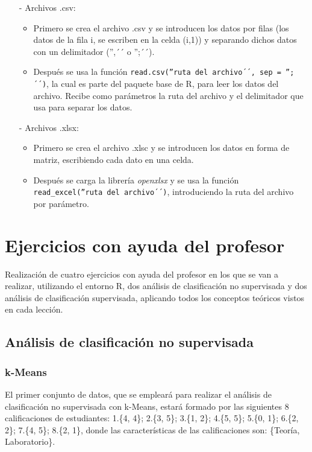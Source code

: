 \documentclass[a4paper, 12pt]{article}
\begin{document}
	\begin{itemize}
		\item[-] Archivos .csv:
		\begin{itemize}
			\item Primero se crea el archivo .csv y se introducen los datos por filas (los datos de la fila i, se escriben en la celda (i,1)) y separando dichos datos con un delimitador ('',´´ o '';´´).
			\item Después se usa la función \texttt{read.csv(''ruta del archivo´´, sep = '';´´)}, la cual es parte del paquete base de R, para leer los datos del archivo. Recibe como parámetros la ruta del archivo y el delimitador que usa para separar los datos.
		\end{itemize}
		
		\item[-] Archivos .xlsx:
		\begin{itemize}
			\item Primero se crea el archivo .xlsc y se introducen los datos en forma de matriz, escribiendo cada dato en una celda.
			\item Después se carga la librería \emph{openxlsx} y se usa la función \texttt{read\_excel(''ruta del archivo´´)}, introduciendo la ruta del archivo por parámetro.
		\end{itemize}
	\end{itemize}
	
	
  \newpage
	
	\section{Ejercicios con ayuda del profesor}
	Realización de cuatro ejercicios con ayuda del profesor en los que se van a realizar, utilizando el entorno R, dos análisis de clasificación no supervisada y dos análisis de clasificación supervisada, aplicando todos los conceptos teóricos vistos en cada lección.

	\subsection{Análisis de clasificación no supervisada}
	
	\subsubsection{k-Means}
	
	El primer conjunto de datos, que se empleará para realizar el análisis de clasificación no supervisada con k-Means, estará formado por las siguientes 8 calificaciones de estudiantes: 1.\{4, 4\}; 2.\{3, 5\}; 3.\{1, 2\}; 4.\{5, 5\}; 5.\{0, 1\}; 6.\{2, 2\}; 7.\{4, 5\}; 8.\{2, 1\}, donde las características de las calificaciones son: \{Teoría, Laboratorio\}.
	
\end{document}
